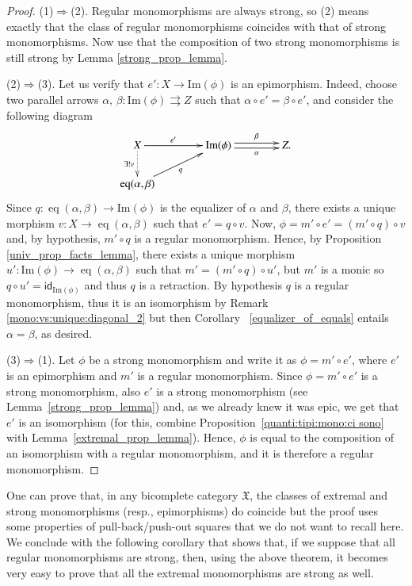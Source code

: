 \documentclass[12pt]{article}
\theoremstyle{definition}
\def\X{\mathfrak X}
\def\Im{\mathrm{Im}}
\DeclareMathOperator{\eq}{eq}
\numberwithin{equation}{section}
\newcommand{\id}[1]{\mathsf{id}_{#1}}
\begin{document}
\begin{proof}
(1)$\Rightarrow$(2). Regular monomorphisms are always strong, so (2) means exactly that the class of regular monomorphisms coincides with that of strong monomorphisms. Now use that the composition of two strong monomorphisms is still strong by Lemma \ref{strong_prop_lemma}. 

\smallskip\noindent
(2)$\Rightarrow$(3). Let us verify that $e'\colon X\to \Im(\phi)$ is an epimorphism. Indeed, choose two parallel arrows $\alpha,\,\beta\colon \Im(\phi)\rightrightarrows Z$ such that $\alpha\circ e'=\beta\circ e'$, and consider the following diagram
\[
\xymatrix@R=20pt@C=40pt{
	X\ar@{.>}[d]_-{\exists!v}\ar[r]^-{e'}&\Im(\phi)  \ar@<-.5ex>[r]_-{\alpha} \ar@<.5ex>[r]^-{\beta}   & Z.\\ 
	\eq(\alpha,\beta)\ar[ur]_-q&& 
}
\]
Since $q\colon \eq(\alpha,\beta)\to \Im(\phi)$ is the equalizer of $\alpha$ and $\beta$, there exists a unique morphism $v\colon X\to \eq(\alpha,\beta)$ such that $e'=q\circ v$. Now, $\phi=m'\circ e'=(m'\circ q)\circ v$ and, by hypothesis, $m'\circ q$ is a regular monomorphism. Hence, by Proposition \ref{univ_prop_facts_lemma}, there exists a unique morphism $u'\colon \Im(\phi)\to \eq(\alpha,\beta)$ such that $m'=(m'\circ q)\circ u'$, but $m'$ is a monic so $q\circ u'=\id{\Im(\phi)}$ and thus $q$ is a retraction. By hypothesis $q$ is a regular monomorphism, thus it is an isomorphism by Remark \ref{mono:vs:unique:diagonal_2} but then Corollary ~\ref{equalizer_of_equals} entails $\alpha=\beta$, as desired.

\smallskip\noindent
(3)$\Rightarrow$(1). Let $\phi$ be a strong monomorphism and write it as  $\phi=m'\circ e'$, where $e'$ is an epimorphism and $m'$ is a regular monomorphism. Since $\phi=m'\circ e'$ is a strong monomorphism, also $e'$ is a strong monomorphism (see Lemma~\ref{strong_prop_lemma}) and, as we already knew it was epic, we get that $e'$ is an isomorphism (for this, combine Proposition~\ref{quanti:tipi:mono:ci sono} with Lemma~\ref{extremal_prop_lemma}). Hence, $\phi$ is equal to the composition of an isomorphism with a regular monomorphism, and it is therefore a regular monomorphism. \qedhere 
\end{proof}

One can prove that, in any bicomplete category $\X$, the classes of extremal and strong monomorphisms (resp., epimorphisms) do coincide but the proof uses some properties of pull-back/push-out squares that we do not want to recall here. We conclude with the following corollary that shows that, if we suppose that all regular monomorphisms are strong, then, using the above theorem, it becomes very easy to prove that all the extremal monomorphisms are strong as well.
\end{document}
